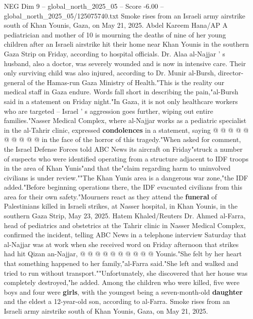 \begin{textsample}{NEG Dim 9 – global\_north\_2025\_05 – Score -6.00 – global\_north\_2025\_05/125075740.txt}  \label{ex:f9_neg_175}
Smoke rises from an Israeli army airstrike south of Khan Younis, Gaza, on May 21, 2025.
Abdel Kareem Hana/AP A pediatrician and mother of 10 is mourning the deaths of nine of her young children after an Israeli airstrike hit their home near Khan Younis in the southern Gaza Strip on Friday, according to hospital officials.
Dr.
Alaa al-Najjar ' s husband, also a doctor, was severely wounded and is now in intensive care.
Their only surviving child was also injured, according to Dr.
Munir al-Bursh, director-general of the Hamas-run Gaza Ministry of Health."This is the reality our medical staff in Gaza endure.
Words fall short in describing the pain,"al-Bursh said in a statement on Friday night."In Gaza, it is not only healthcare workers who are targeted -- Israel ' s aggression goes further, wiping out entire families."Nasser Medical Complex, where al-Najjar works as a pediatric specialist in the al-Tahrir clinic, expressed \textbf{condolences} in a statement, saying @ @ @ @ @ @ @ @ @ @ in the face of the horror of this tragedy."When asked for comment, the Israel Defense Forces told ABC News its aircraft on Friday"struck a number of suspects who were identified operating from a structure adjacent to IDF troops in the area of Khan Yunis"and that the"claim regarding harm to uninvolved civilians is under review.""The Khan Yunis area is a dangerous war zone,"the IDF added."Before beginning operations there, the IDF evacuated civilians from this area for their own safety."Mourners react as they attend the \textbf{funeral} of Palestinians killed in Israeli strikes, at Nasser hospital, in Khan Younis, in the southern Gaza Strip, May 23, 2025.
Hatem Khaled/Reuters Dr.
Ahmed al-Farra, head of pediatrics and obstetrics at the Tahrir clinic in Nasser Medical Complex, confirmed the incident, telling ABC News in a telephone interview Saturday that al-Najjar was at work when she received word on Friday afternoon that strikes had hit Qizan an-Najjar, @ @ @ @ @ @ @ @ @ @ Younis."She felt by her heart that something happened to her family,"al-Farra said."She left and walked and tried to run without transport.""Unfortunately, she discovered that her house was completely destroyed,"he added.
Among the children who were killed, five were boys and four were \textbf{girls}, with the youngest being a seven-month-old \textbf{daughter} and the eldest a 12-year-old son, according to al-Farra.
Smoke rises from an Israeli army airstrike south of Khan Younis, Gaza, on May 21, 2025.

\end{textsample}
